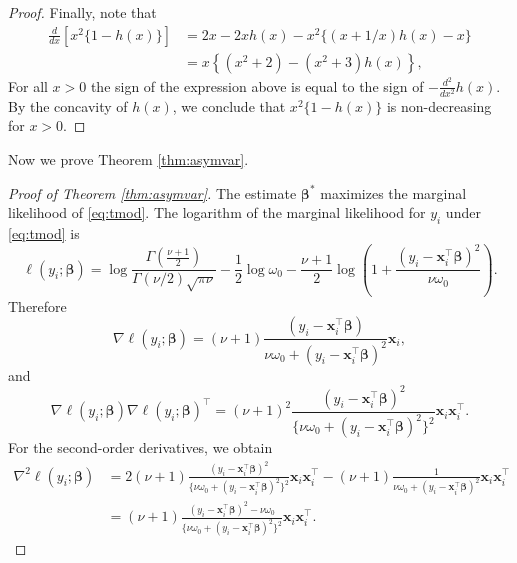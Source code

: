 \documentclass[12pt]{article}
\newcommand{\bl}[1]{{\mathbf #1}}
\newcommand{\bs}[1]{\boldsymbol #1}
\begin{document}
\begin{proof}
Finally, note that
\begin{equation*}
    \begin{aligned}
        \frac{d}{dx} [x^2\{1 - h(x)\}] &= 2x - 2x h(x) - x^2\{(x + 1/x)h(x) - x\} \\
        &= x\left\{(x^2 + 2) - (x^2 + 3)h(x)\right\},
    \end{aligned}
\end{equation*}
For all $x > 0$ the sign of the expression above is equal to the sign of $-\frac{d^2}{dx^2} h(x)$. By the concavity of $h(x)$, we conclude that $x^2\{1 - h(x)\}$ is non-decreasing for $x > 0$.
\end{proof}

Now we prove Theorem \ref{thm:asymvar}.
\begin{proof}[Proof of Theorem \ref{thm:asymvar}]
The estimate $\bs{\beta}^*$ maximizes the marginal likelihood of \eqref{eq:tmod}. The logarithm of the marginal likelihood for $y_i$ under \eqref{eq:tmod} is
\begin{equation*}
    \ell(y_i ; \bs{\beta}) = \log \frac{\Gamma\left(\frac{\nu +1 }{2}\right)}{\Gamma(\nu/2)\sqrt{\pi \nu}} - \frac{1}{2}\log \omega_0 - \frac{\nu+1}{2} \log\left(1 + \frac{(y_i - \bl{x}_i^\top \bs{\beta})^2}{\nu \omega_0} \right).
\end{equation*}
Therefore
\begin{equation*}
    \nabla \ell(y_i ; \bs{\beta}) = (\nu+1) \frac{(y_i - \bl{x}_i^\top \bs{\beta})}{\nu \omega_0 + (y_i - \bl{x}_i^\top \bs{\beta})^2 } \bl{x}_i,
\end{equation*}
and
\begin{equation*}
    \nabla \ell(y_i ; \bs{\beta}) \nabla \ell(y_i ; \bs{\beta})^\top = (\nu+1)^2 \frac{(y_i - \bl{x}_i^\top \bs{\beta})^2}{\{\nu \omega_0 + (y_i - \bl{x}_i^\top \bs{\beta})^2\}^2 } \bl{x}_i \bl{x}_i^\top.
\end{equation*}
For the second-order derivatives, we obtain
\begin{equation*}
\begin{aligned}
    \nabla^2 \ell(y_i ; \bs{\beta}) &= 2 (\nu+1) \frac{(y_i - \bl{x}_i^\top \bs{\beta})^2}{\{\nu \omega_0 + (y_i - \bl{x}_i^\top \bs{\beta})^2\}^2 } \bl{x}_i \bl{x}_i^\top - (\nu+1) \frac{1}{\nu \omega_0 + (y_i - \bl{x}_i^\top \bs{\beta})^2 } \bl{x}_i \bl{x}_i^\top\\
    &=(\nu+1) \frac{(y_i - \bl{x}_i^\top \bs{\beta})^2 - \nu \omega_0}{\{\nu \omega_0 + (y_i - \bl{x}_i^\top \bs{\beta})^2\}^2} \bl{x}_i \bl{x}_i^\top.
\end{aligned}

\end{equation*}
\end{proof}
\end{document}
